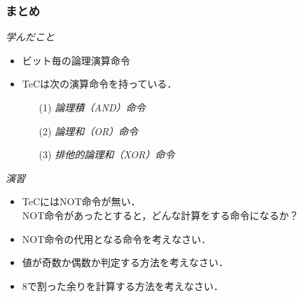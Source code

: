 \documentclass[handout]{beamer}        %
\begin{document}
\begin{frame}
  \frametitle{まとめ}
  \emph{学んだこと}
  \begin{itemize}
  \item ビット毎の論理演算命令
  \item TeCは次の演算命令を持っている．
    \begin{enumerate}
    \item[(1)] \emph{論理積（AND）命令}
    \item[(2)] \emph{論理和（OR）命令}
    \item[(3)] \emph{排他的論理和（XOR）命令}
    \end{enumerate}
  \end{itemize}
  \vfill
  \emph{演習}
  \begin{itemize}
  \item TeCにはNOT命令が無い．\\
    NOT命令があったとすると，どんな計算をする命令になるか？
  \item NOT命令の代用となる命令を考えなさい．
  \item 値が奇数か偶数か判定する方法を考えなさい．
  \item 8で割った余りを計算する方法を考えなさい．
  \end{itemize}
  \vfill
\end{frame}
\end{document}
